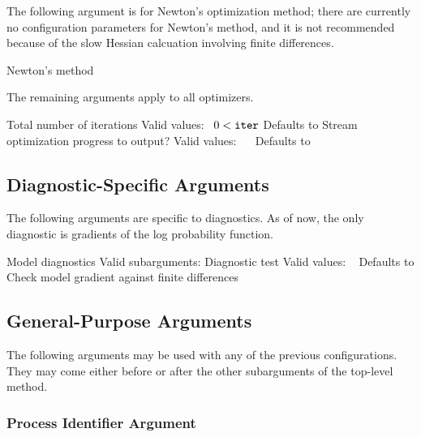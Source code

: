 %
The following argument is for Newton's optimization method;  there are
currently no configuration parameters for Newton's method, and it is
not recommended because of the slow Hessian calcuation involving
finite differences.
%
\begin{description}
        {Newton's method}
%
\end{description}
%
The remaining arguments apply to all optimizers.
\begin{description}
%
      {Total number of iterations}
      {Valid values: \  $0 < \mbox{\code{iter}}$}
      {Defaults to }
%
      {Stream optimization progress to output?}
      {Valid values: \  \ }
      {Defaults to }
%
\end{description}

\subsection{Diagnostic-Specific Arguments}

The following arguments are specific to diagnostics.  As of now, the
only diagnostic is gradients of the log probability function.

\begin{description}

    {Model diagnostics}
    {Valid subarguments: }
%
      {Diagnostic test}
      {Valid values: \  }
      {Defaults to }
%
        {Check model gradient against finite differences}
%
\end{description}

\subsection{General-Purpose Arguments}

The following arguments may be used with any of the previous
configurations.   They may come either before or after the other
subarguments of the top-level method.

\subsubsection{Process Identifier Argument}

